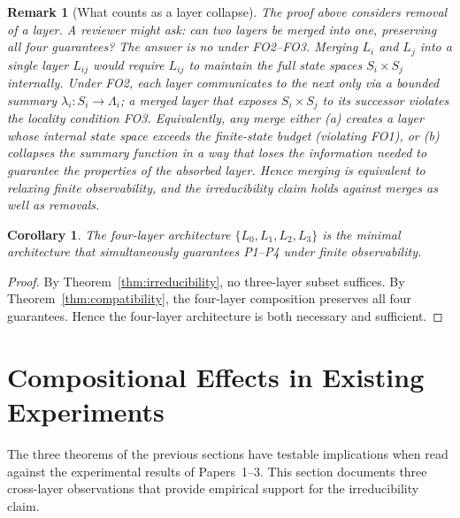 \documentclass[11pt]{article}
\newtheorem{corollary}[theorem]{Corollary}
\newtheorem{remark}[theorem]{Remark}
\newcommand{\Layer}[1]{L_{#1}}
\newcommand{\State}[1]{S_{#1}}
\newcommand{\Sum}[1]{\lambda_{#1}}
\begin{document}
\begin{remark}[What counts as a layer collapse]
\label{rem:collapse}
The proof above considers \emph{removal} of a layer.  A reviewer might ask:
can two layers be \emph{merged} into one, preserving all four guarantees?
The answer is no under FO2--FO3.  Merging $\Layer{i}$ and $\Layer{j}$ into a
single layer $\Layer{ij}$ would require $\Layer{ij}$ to maintain the full
state spaces $\State{i} \times \State{j}$ internally.  Under FO2, each layer
communicates to the next only via a bounded summary $\Sum{i}: \State{i} \to
\Lambda_i$; a merged layer that exposes $\State{i} \times \State{j}$ to its
successor violates the locality condition FO3.  Equivalently, any merge
either (a) creates a layer whose internal state space exceeds the finite-state
budget (violating FO1), or (b) collapses the summary function in a way that
loses the information needed to guarantee the properties of the absorbed
layer.  Hence merging is equivalent to relaxing finite observability, and the
irreducibility claim holds against merges as well as removals.
\end{remark}

\begin{corollary}
\label{cor:necessity}
The four-layer architecture $\{\Layer{0},\Layer{1},\Layer{2},\Layer{3}\}$ is
the minimal architecture that simultaneously guarantees P1--P4 under finite
observability.
\end{corollary}

\begin{proof}
By Theorem~\ref{thm:irreducibility}, no three-layer subset suffices. By
Theorem~\ref{thm:compatibility}, the four-layer composition preserves all
four guarantees. Hence the four-layer architecture is both necessary and
sufficient.
\end{proof}

\section{Compositional Effects in Existing Experiments}
\label{sec:empirical}

The three theorems of the previous sections have testable implications when
read against the experimental results of Papers~1--3. This section documents
three cross-layer observations that provide empirical support for the
irreducibility claim.
\end{document}
